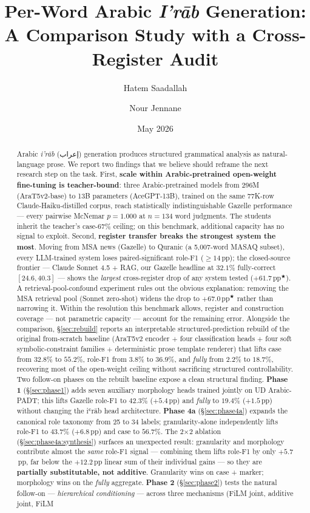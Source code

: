 \documentclass[10pt,a4paper,twocolumn]{article}
\title{\textbf{Per-Word Arabic \textit{I'r\=ab} Generation:\\
A Comparison Study with a Cross-Register Audit}}
\author{Hatem Saadallah \and Nour Jennane}
\date{May 2026}
\providecommand{\textarabic}[1]{{\arabicfont #1}}
\newcommand{\sig}{\ensuremath{^{\bigstar}}}
\newcommand{\irab}{\textit{i'r{\=a}b}}
\begin{document}
\maketitle

\begin{abstract}
\noindent
Arabic \irab{} (\textarabic{إعراب}) generation produces structured grammatical analysis as natural-language prose. We report two findings that we believe should reframe the next research step on the task. First, \textbf{scale within Arabic-pretrained open-weight fine-tuning is teacher-bound}: three Arabic-pretrained models from 296M (AraT5v2-base) to 13B parameters (AceGPT-13B), trained on the same 77K-row Claude-Haiku-distilled corpus, reach statistically indistinguishable Gazelle performance --- every pairwise McNemar $p{=}1.000$ at $n{=}134$ word judgments. The students inherit the teacher's case-67\% ceiling; on this benchmark, additional capacity has no signal to exploit. Second, \textbf{register transfer breaks the strongest system the most}. Moving from MSA news (Gazelle) to Quranic (a 5{,}007-word MASAQ subset), every LLM-trained system loses paired-significant role-F1 ($\geq 14$\,pp); the closed-source frontier --- Claude Sonnet 4.5 + RAG, our Gazelle headline at $32.1\%$ fully-correct $[24.6, 40.3]$ --- shows the \emph{largest} cross-register drop of any system tested ($+61.7$\,pp\sig{}). A retrieval-pool-confound experiment rules out the obvious explanation: removing the MSA retrieval pool (Sonnet zero-shot) widens the drop to $+67.0$\,pp\sig{} rather than narrowing it. Within the resolution this benchmark allows, register and construction coverage --- not parametric capacity --- account for the remaining error. Alongside the comparison, \S\ref{sec:rebuild} reports an interpretable structured-prediction rebuild of the original from-scratch baseline (AraT5v2 encoder $+$ four classification heads $+$ four soft symbolic-constraint families $+$ deterministic prose template renderer) that lifts case from $32.8\%$ to $55.2\%$, role-F1 from $3.8\%$ to $36.9\%$, and \emph{fully} from $2.2\%$ to $18.7\%$, recovering most of the open-weight ceiling without sacrificing structured controllability. Two follow-on phases on the rebuilt baseline expose a clean structural finding. \textbf{Phase 1} (\S\ref{sec:phase1}) adds seven auxiliary morphology heads trained jointly on UD Arabic-PADT; this lifts Gazelle role-F1 to $42.3\%$ ($+5.4$\,pp) and \emph{fully} to $19.4\%$ ($+1.5$\,pp) without changing the iʿrāb head architecture. \textbf{Phase 4a} (\S\ref{sec:phase4a}) expands the canonical role taxonomy from 25 to 34 labels; granularity-alone independently lifts role-F1 to $43.7\%$ ($+6.8$\,pp) and case to $56.7\%$. The 2$\times$2 ablation (\S\ref{sec:phase4a:synthesis}) surfaces an unexpected result: granularity and morphology contribute almost the \emph{same} role-F1 signal --- combining them lifts role-F1 by only $+5.7$\,pp, far below the $+12.2$\,pp linear sum of their individual gains --- so they are \textbf{partially substitutable, not additive}. Granularity wins on case + marker; morphology wins on the \emph{fully} aggregate. \textbf{Phase 2} (\S\ref{sec:phase2}) tests the natural follow-on --- \emph{hierarchical conditioning} --- across three mechanisms (FiLM joint, additive joint, FiLM 
\end{abstract}
\end{document}
